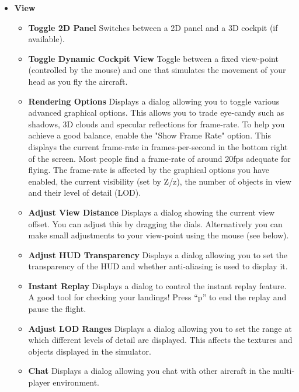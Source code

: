 \begin{itemize}
 \item \textbf{View}
 \begin{itemize}
  \item \textbf{Toggle 2D Panel}  Switches between a 2D panel and a 3D cockpit
(if available).
  \item \textbf{Toggle Dynamic Cockpit View}  Toggle between a fixed view-point
  (controlled by the mouse) and one that simulates the movement of your head as
  you fly the aircraft.  
  \item \textbf{Rendering Options} Displays a dialog allowing you to toggle
various advanced graphical options. 
  This allows you to trade eye-candy such as shadows, 3D clouds and specular
reflections for frame-rate. 
  To help you achieve a good balance, enable the "Show Frame Rate" option. 
  This displays the current frame-rate in frames-per-second in the bottom right
of the screen. 
  Most people find a frame-rate of around 20fps adequate for flying. The
frame-rate is affected by the 
  graphical options you have enabled, the current visibility (set by Z/z), the
number of objects in view 
  and their level of detail (LOD).
  \item \textbf{Adjust View Distance}  Displays a dialog showing the current
view offset. 
  You can adjust this by dragging the dials. Alternatively you can make small
adjustments 
  to your view-point using the mouse (see below).
  \item \textbf{Adjust HUD Transparency}  Displays a dialog allowing you to set
the transparency 
  of the HUD and whether anti-aliasing is used to display it. 
  \item \textbf{Instant Replay} Displays a dialog to control the instant replay
feature. 
  A good tool for checking your landings! Press ``p'' to end the replay and
pause the flight.
  \item \textbf{Adjust LOD Ranges} Displays a dialog allowing you to set the
range at which different 
  levels of detail are displayed. This affects the textures and objects
displayed in the simulator. 
  \item \textbf{Chat} Displays a dialog allowing you chat with other aircraft in
the multi-player
  environment. 
 \end{itemize}
 

\end{itemize}
